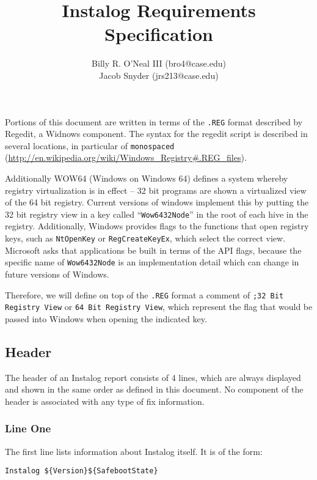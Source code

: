 \documentclass[letterpaper,12pt]{article}
\title{Instalog Requirements Specification}
\author{
Billy R. O'Neal III (bro4@case.edu) \\
Jacob Snyder (jrs213@case.edu)
}
\begin{document}
\maketitle





Portions of this document are written in terms of the \verb|.REG| format
described by Regedit, a Widnows component. The syntax for the regedit script is
described in several locations, in particular  of \texttt{monospaced}
(\url{http://en.wikipedia.org/wiki/Windows_Registry#.REG_files}).

Additionally WOW64 (Windows on Windows 64) defines a system whereby registry
virtualization is in effect -- 32 bit programs are shown a virtualized view of
the 64 bit registry. Current versions of windows implement this by putting the
32 bit registry view in a key called ``\verb|Wow6432Node|'' in the root of each
hive in the registry. Additionally, Windows provides flags to the functions that open
registry keys, such as \verb|NtOpenKey| or \verb|RegCreateKeyEx|, which select
the correct view. Microsoft asks that applications be built in terms of the API
flags, because the specific name of \verb|Wow6432Node| is an implementation
detail which can change in future versions of Windows.

Therefore, we will define on top of the \verb|.REG| format a comment of
\verb|;32 Bit Registry View| or \verb|64 Bit Registry View|, which represent the
flag that would be passed into Windows when opening the indicated key.



\subsection{Header}
The header of an Instalog report consists of 4 lines, which are always displayed
and shown in the same order as defined in this document. No component of the
header is associated with any type of fix information.

\subsubsection{Line One}
The first line lists information about Instalog itself. It is of the form:
\begin{verbatim}
Instalog ${Version}${SafebootState}
\end{verbatim}
\end{document}
